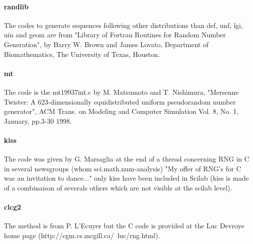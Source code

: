 \begin{authors}
  \paragraph{randlib} 
  The codes to generate sequences following other distributions than def, unf, lgi,  uin and geom are
  from "Library of Fortran Routines for Random Number  Generation", by Barry W. Brown 
  and James Lovato, Department of Biomathematics, The University of Texas, Houston.  
  \paragraph{mt} 
  The code is the mt19937int.c by M. Matsumoto and  T. Nishimura, "Mersenne Twister: 
  A 623-dimensionally equidistributed  uniform pseudorandom number generator", 
  ACM Trans. on Modeling and  Computer Simulation Vol. 8, No. 1, January, pp.3-30 1998.
  \paragraph{kiss} 
  The code was given by G. Marsaglia at the end of a thread concerning RNG in C in several 
  newsgroups (whom sci.math.num-analysis) "My offer of  RNG's for C was an invitation 
  to dance..." only kiss have been included in Scilab (kiss is made of a combinaison of 
  severals others which are not visible at the scilab level).
  \paragraph{clcg2} 
  The method is from P. L'Ecuyer but the C code is provided at the Luc  Devroye home page 
  (http://cgm.cs.mcgill.ca/~luc/rng.html).
\end{authors}
